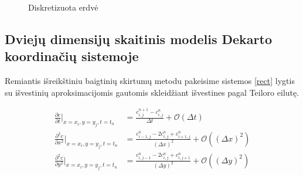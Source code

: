 \begin{figure}[!h]
\centering
{}
\caption{ Diskretizuota erdvė }
\end{figure}



\newpage
\subsection{Dviejų dimensijų skaitinis modelis Dekarto koordinačių sistemoje}

Remiantis išreikštiniu baigtinių skirtumų metodu pakeisime sistemos \eqref{rect} lygtis su išvestinių aproksimacijomis gautomis skleidžiant išvestines pagal Teiloro eilutę.

\begin{subequations} \label{finite-diffs}
\begin{align}
	\frac{\partial c}{\partial t}\Big|_{x=x_i, y=y_j, t=t_n}&=\frac{c^{n+1}_{i,j}-c^n_{i,j}}{\Delta t} + \mathcal{O}(\Delta t)\\
    \frac{\partial^2c}{\partial x^2}\Big|_{x=x_i, y=y_j, t=t_n}&=\frac{c^n_{i-1,j} - 2c^n_{i,j} + c^n_{i+1,j}}{(\Delta x)^2} + \mathcal{O}((\Delta x)^2)\\
    \frac{\partial^2c}{\partial y^2}\Big|_{x=x_i, y=y_j, t=t_n}&=\frac{c^n_{i,j-1} - 2c^n_{i,j} + c^n_{i,j+1}}{(\Delta y)^2} + \mathcal{O}((\Delta y)^2)
\end{align}
\end{subequations}

